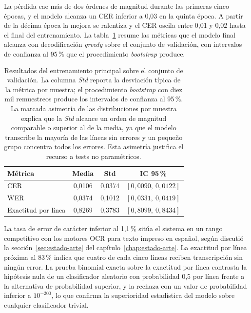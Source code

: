 La pérdida cae más de dos órdenes de magnitud durante las primeras cinco épocas, y el modelo alcanza un CER inferior a 0,03 en la quinta época. A partir de la décima época la mejora se ralentiza y el CER oscila entre 0,01 y 0,02 hasta el final del entrenamiento. La tabla~\ref{tab:resultados-principal} resume las métricas que el modelo final alcanza con decodificación \textit{greedy} sobre el conjunto de validación, con intervalos de confianza al 95\,\% que el procedimiento \textit{bootstrap} produce.

\begin{table}[!htbp]
	\centering
	\caption{Resultados del entrenamiento principal sobre el conjunto de validación. La columna \emph{Std} reporta la desviación típica de la métrica por muestra; el procedimiento \textit{bootstrap} con diez mil remuestreos produce los intervalos de confianza al 95\,\%. La marcada asimetría de las distribuciones por muestra explica que la \emph{Std} alcance un orden de magnitud comparable o superior al de la media, ya que el modelo transcribe la mayoría de las líneas sin errores y un pequeño grupo concentra todos los errores. Esta asimetría justifica el recurso a tests no paramétricos.}
	\label{tab:resultados-principal}
	\begin{tabular}{lccc}
		\toprule
		\textbf{Métrica} & \textbf{Media} & \textbf{Std} & \textbf{IC 95\,\%} \\
		\midrule
		CER             & 0,0106 & 0,0374 & $[0{,}0090,\ 0{,}0122]$ \\
		WER             & 0,0374 & 0,1012 & $[0{,}0331,\ 0{,}0419]$ \\
		Exactitud por línea & 0,8269 & 0,3783 & $[0{,}8099,\ 0{,}8434]$ \\
		\bottomrule
	\end{tabular}
\end{table}

La tasa de error de carácter inferior al 1,1\,\% sitúa el sistema en un rango competitivo con los motores OCR para texto impreso en español, según discutió la sección~\ref{sec:estado-arte} del capítulo~\ref{chap:estado-arte}. La exactitud por línea próxima al 83\,\% indica que cuatro de cada cinco líneas reciben transcripción sin ningún error. La prueba binomial exacta sobre la exactitud por línea contrasta la hipótesis nula de un clasificador aleatorio con probabilidad 0,5 por línea frente a la alternativa de probabilidad superior, y la rechaza con un valor de probabilidad inferior a $10^{-200}$, lo que confirma la superioridad estadística del modelo sobre cualquier clasificador trivial.

